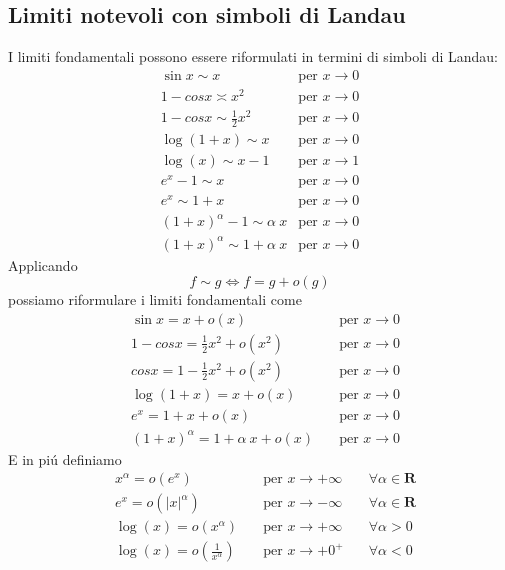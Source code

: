 \documentclass{book}
\begin{document}
\begin{proposition}
    \subsection{Limiti notevoli con simboli di Landau}
    I limiti fondamentali possono essere riformulati in termini di simboli di Landau:
    \begin{align*}
         & \sin x \sim x \quad               & \text{per } x \to 0 & \\
         & 1 - cosx \asymp x^2 \quad         & \text{per } x \to 0 & \\
         & 1-cosx \sim \frac{1}{2} x^2 \quad & \text{per } x \to 0 & \\
         & \log(1+x) \sim x \quad            & \text{per } x \to 0 & \\
         & \log(x) \sim x-1 \quad            & \text{per } x \to 1 & \\
         & e^x - 1 \sim x \quad              & \text{per } x \to 0 & \\
         & e^x \sim 1 + x \quad              & \text{per } x \to 0 & \\
         & (1+x)^\alpha - 1 \sim \alpha\ x   & \text{per } x \to 0 & \\
         & (1+x)^\alpha \sim 1 + \alpha\ x   & \text{per } x \to 0 &
    \end{align*}
    Applicando
    \[ f \sim g \iff f = g + o(g)\]
    possiamo riformulare i limiti fondamentali come
    \begin{align*}
         & \sin x        = x + o(x) \quad                 & \text{per } x \to 0 \\
         & 1 - cosx      = \frac{1}{2} x^2 + o(x^2) \quad & \text{per } x \to 0 \\
         & cosx      = 1 - \frac{1}{2} x^2 + o(x^2) \quad & \text{per } x \to 0 \\
         & \log(1+x)     = x + o(x) \quad                 & \text{per } x \to 0 \\
         & e^x            = 1 + x + o(x) \quad            & \text{per } x \to 0 \\
         & (1+x)^\alpha  = 1 + \alpha\ x + o(x) \quad     & \text{per } x \to 0
    \end{align*}
    E in pi\'u definiamo
    \begin{align}
         & x^\alpha = o(e^x) \quad                        & \text{per } x \to +\infty & \quad\forall \alpha \in \mathbf{R} \\
         & e^x=o(|x|^\alpha) \quad                        & \text{per } x \to -\infty & \quad\forall \alpha \in \mathbf{R} \\
         & \log(x)=o(x^\alpha) \quad                      & \text{per } x \to +\infty & \quad\forall \alpha > 0            \\
         & \log(x)=o\left(\frac{1}{x^\alpha}\right) \quad & \text{per } x \to +0^+    & \quad\forall \alpha < 0
    \end{align}
\end{proposition}
\end{document}
